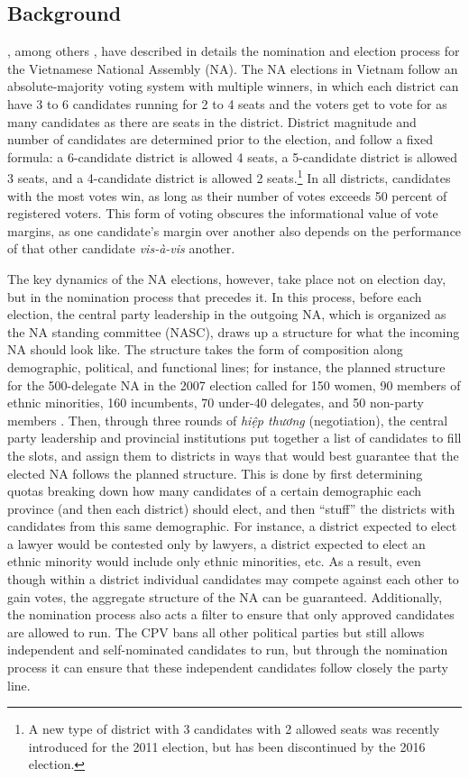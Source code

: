 \documentclass[12pt]{article}\usepackage[]{graphicx}\usepackage[]{color}
\newcommand{\1}{\mathbbm{1}}
\begin{document}
\subsection{Background}

\cite{MaleskySchuler2011}, among others \citep[e.g][]{Gainsborough2005}, have described in details the nomination and election process for the Vietnamese National Assembly (NA). The NA elections in Vietnam follow an absolute-majority voting system with multiple winners, in which each district can have 3 to 6 candidates running for 2 to 4 seats and the voters get to vote for as many candidates as there are seats in the district. District magnitude and number of candidates are determined prior to the election, and follow a fixed formula: a 6-candidate district is allowed 4 seats, a 5-candidate district is allowed 3 seats, and a 4-candidate district is allowed 2 seats.\footnote{A new type of district with 3 candidates with 2 allowed seats was recently introduced for the 2011 election, but has been discontinued by the 2016 election.} In all districts, candidates with the most votes win, as long as their number of votes exceeds 50 percent of registered voters. This form of voting obscures the informational value of vote margins, as one candidate's margin over another also depends on the performance of that other candidate \textit{vis-\`{a}-vis} another.

The key dynamics of the NA elections, however, take place not on election day, but in the nomination process that precedes it. In this process, before each election, the central party leadership in the outgoing NA, which is organized as the NA standing committee (NASC), draws up a structure for what the incoming NA should look like. The structure takes the form of composition along demographic, political, and functional lines; for instance, the planned structure for the 500-delegate NA in the 2007 election called for 150 women, 90 members of ethnic minorities, 160 incumbents, 70 under-40 delegates, and 50 non-party members  \citep[506]{MaleskySchuler2011}. Then, through three rounds of \textit{hiệp thương} (negotiation), the central party leadership and provincial institutions put together a list of candidates to fill the slots, and assign them to districts in ways that would best guarantee that the elected NA follows the planned structure. This is done by first determining quotas breaking down how many candidates of a certain demographic each province (and then each district) should elect, and then ``stuff'' the districts with candidates from this same demographic. For instance, a district expected to elect a lawyer would be contested only by lawyers, a district expected to elect an ethnic minority would include only ethnic minorities, etc. As a result, even though within a district individual candidates may compete against each other to gain votes, the aggregate structure of the NA can be guaranteed. Additionally, the nomination process also acts a filter to ensure that only approved candidates are allowed to run. The CPV bans all other political parties but still allows independent and self-nominated candidates to run, but through the nomination process it can ensure that these independent candidates follow closely the party line.
\end{document}
